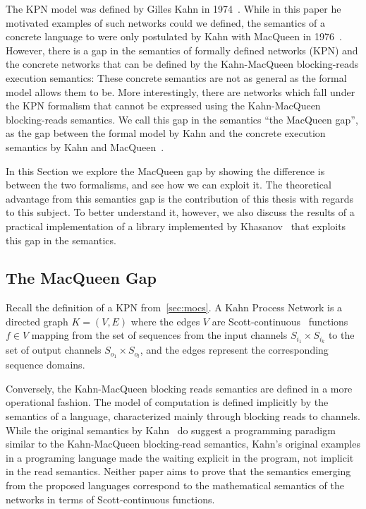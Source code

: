 The \ac{KPN} model was defined by Gilles Kahn in 1974~\cite{kahn74}. While in this paper he motivated examples of such networks could we defined, the semantics of a concrete language to were only postulated by Kahn with MacQueen in 1976~\cite{macqueen}. However, there is a gap in the semantics of formally defined networks (\ac{KPN}) and the concrete networks that can be defined by the Kahn-MacQueen blocking-reads execution semantics: These concrete semantics are not as general as the formal model allows them to be. More interestingly, there are networks which fall under the \ac{KPN} formalism that cannot be expressed using the Kahn-MacQueen blocking-reads semantics. We call this gap in the semantics ``the MacQueen gap'', as the gap between the formal model by Kahn and the concrete execution semantics by Kahn and MacQueen~\cite{lee_matsikoudis_semantics,khasanov_parmaditam18}. 

In this Section we explore the MacQueen gap by showing the difference is between the two formalisms, and see how we can exploit it. The theoretical advantage from this semantics gap is the contribution of this thesis with regards to this subject. To better understand it, however, we also discuss the results of a practical implementation of a library implemented by Khasanov~\cite{khasanov_parmaditam18} that exploits this gap in the semantics. 

\subsection{The MacQueen Gap}

Recall the definition of a \ac{KPN} from~\ref{sec:mocs}.
A Kahn Process Network is a directed graph $K = (V,E)$ where the edges $V$ are Scott-continuous~\cite{scott_theory_of_computation} functions $f \in V$ mapping from the set of sequences from the input channels $S_{i_1} \times S_{i_k}$ to the set of output channels $S_{o_1} \times S_{o_l}$, and the edges represent the corresponding sequence domains.

Conversely, the Kahn-MacQueen blocking reads semantics are defined in a more operational fashion. The model of computation is defined implicitly by the semantics of a language\cite{kahn-macqueen}, characterized mainly through blocking reads to channels. While the original semantics by Kahn~\cite{kahn74} do suggest a programming paradigm similar to the Kahn-MacQueen blocking-read semantics, Kahn's original examples in a programing language made the waiting explicit in the program, not implicit in the read semantics. Neither paper aims to prove that the semantics emerging from the proposed languages correspond to the mathematical semantics of the networks in terms of Scott-continuous functions.

